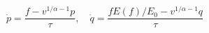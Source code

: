 \documentclass{article}
\begin{document}
\fontsize{22}{29}\selectfont
\[
\dot p=\frac{f-v^{1/\alpha-1}p}{\tau},\quad\dot q=\frac{fE(f)/E_0-v^{1/\alpha-1}q}{\tau}
\]
\end{document}

